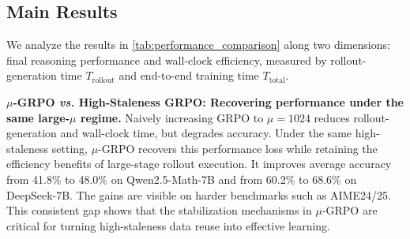
\subsection{Main Results}
\label{sec:analysis}
We analyze the results in \cref{tab:performance_comparison} along two dimensions: final
reasoning performance and wall-clock efficiency, measured by rollout-generation
time $T_{\mathrm{rollout}}$ and end-to-end training time $T_{\mathrm{total}}$.


\textbf{\boldmath $\mu$-GRPO \textit{vs.} High-Staleness GRPO: Recovering performance under the same large-$\mu$ regime.}
Naively increasing GRPO to $\mu\!=\!1024$ reduces rollout-generation and
wall-clock time, but degrades accuracy. Under the same
high-staleness setting, $\mu$-GRPO recovers this performance loss while retaining
the efficiency benefits of large-stage rollout execution. It improves average
accuracy from 41.8\% to 48.0\% on Qwen2.5-Math-7B and from 60.2\% to 68.6\% on
DeepSeek-7B. The gains are visible on harder benchmarks such as
AIME24/25. This consistent gap shows that the stabilization mechanisms in
$\mu$-GRPO are critical for turning high-staleness data reuse into effective learning. 







